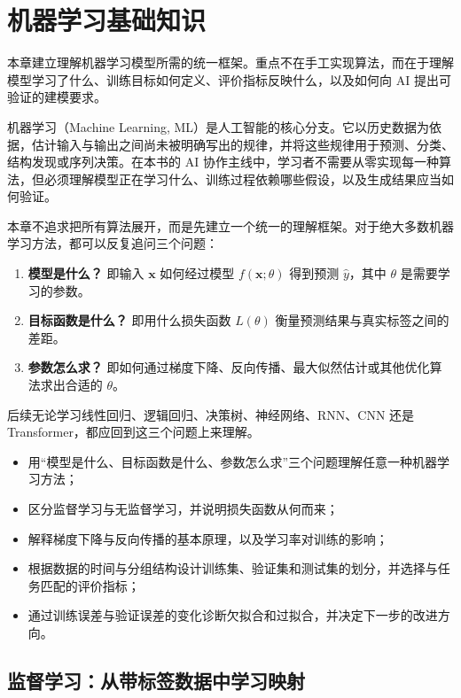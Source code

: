 ﻿\chapter{机器学习基础知识}

本章建立理解机器学习模型所需的统一框架。重点不在手工实现算法，而在于理解模型学习了什么、训练目标如何定义、评价指标反映什么，以及如何向 AI 提出可验证的建模要求。

机器学习（Machine Learning, ML）是人工智能的核心分支。它以历史数据为依据，估计输入与输出之间尚未被明确写出的规律，并将这些规律用于预测、分类、结构发现或序列决策。在本书的 AI 协作主线中，学习者不需要从零实现每一种算法，但必须理解模型正在学习什么、训练过程依赖哪些假设，以及生成结果应当如何验证。

本章不追求把所有算法展开，而是先建立一个统一的理解框架。对于绝大多数机器学习方法，都可以反复追问三个问题：
\begin{enumerate}
    \item \textbf{模型是什么？} 即输入 $\mathbf{x}$ 如何经过模型 $f(\mathbf{x};\theta)$ 得到预测 $\hat{y}$，其中 $\theta$ 是需要学习的参数。
    \item \textbf{目标函数是什么？} 即用什么损失函数 $L(\theta)$ 衡量预测结果与真实标签之间的差距。
    \item \textbf{参数怎么求？} 即如何通过梯度下降、反向传播、最大似然估计或其他优化算法求出合适的 $\theta$。
\end{enumerate}
后续无论学习线性回归、逻辑回归、决策树、神经网络、RNN、CNN 还是 Transformer，都应回到这三个问题上来理解。

\begin{chapterguide}
\begin{itemize}
  \item 用“模型是什么、目标函数是什么、参数怎么求”三个问题理解任意一种机器学习方法；
  \item 区分监督学习与无监督学习，并说明损失函数从何而来；
  \item 解释梯度下降与反向传播的基本原理，以及学习率对训练的影响；
  \item 根据数据的时间与分组结构设计训练集、验证集和测试集的划分，并选择与任务匹配的评价指标；
  \item 通过训练误差与验证误差的变化诊断欠拟合和过拟合，并决定下一步的改进方向。
\end{itemize}
\end{chapterguide}

\section{监督学习：从带标签数据中学习映射}

